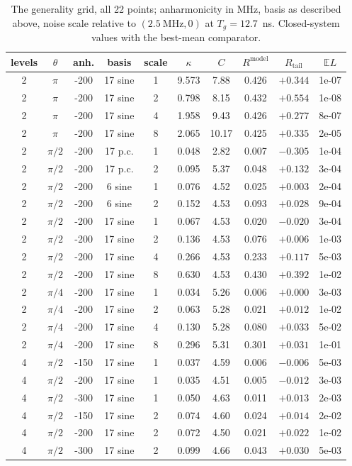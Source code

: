 \documentclass[aps,pra,onecolumn,notitlepage,superscriptaddress,nofootinbib,floatfix]{revtex4-2}
\newcommand{\E}{\mathbb{E}}
\newcommand{\Rt}{R_{\mathrm{tail}}}
\newcommand{\Rm}{R^{\mathrm{model}}}
\begin{document}
\begin{table}[htbp]
\centering\small\setlength{\tabcolsep}{4pt}
\caption{The generality grid, all 22 points; anharmonicity in MHz, basis as
described above, noise scale relative to $(2.5~\mathrm{MHz},0)$ at
$T_g=12.7$~ns. Closed-system values with the best-mean comparator.}
\label{tab:stage3C}
\begin{tabular}{@{}cccccccccc@{}}
\toprule
levels & $\theta$ & anh. & basis & scale & $\kappa$ & $C$ & $\Rm$ & $\Rt$ & $\E L$\\
\midrule
2 & $\pi$ & -200 & 17 sine & 1 & 9.573 & 7.88 & 0.426 & $+0.344$ & 1e-07 \\
2 & $\pi$ & -200 & 17 sine & 2 & 0.798 & 8.15 & 0.432 & $+0.554$ & 1e-08 \\
2 & $\pi$ & -200 & 17 sine & 4 & 1.958 & 9.43 & 0.426 & $+0.277$ & 8e-07 \\
2 & $\pi$ & -200 & 17 sine & 8 & 2.065 & 10.17 & 0.425 & $+0.335$ & 2e-05 \\
2 & $\pi/2$ & -200 & 17 p.c. & 1 & 0.048 & 2.82 & 0.007 & $-0.305$ & 1e-04 \\
2 & $\pi/2$ & -200 & 17 p.c. & 2 & 0.095 & 5.37 & 0.048 & $+0.132$ & 3e-04 \\
2 & $\pi/2$ & -200 & 6 sine & 1 & 0.076 & 4.52 & 0.025 & $+0.003$ & 2e-04 \\
2 & $\pi/2$ & -200 & 6 sine & 2 & 0.152 & 4.53 & 0.093 & $+0.028$ & 9e-04 \\
2 & $\pi/2$ & -200 & 17 sine & 1 & 0.067 & 4.53 & 0.020 & $-0.020$ & 3e-04 \\
2 & $\pi/2$ & -200 & 17 sine & 2 & 0.136 & 4.53 & 0.076 & $+0.006$ & 1e-03 \\
2 & $\pi/2$ & -200 & 17 sine & 4 & 0.266 & 4.53 & 0.233 & $+0.117$ & 5e-03 \\
2 & $\pi/2$ & -200 & 17 sine & 8 & 0.630 & 4.53 & 0.430 & $+0.392$ & 1e-02 \\
2 & $\pi/4$ & -200 & 17 sine & 1 & 0.034 & 5.26 & 0.006 & $+0.000$ & 3e-03 \\
2 & $\pi/4$ & -200 & 17 sine & 2 & 0.063 & 5.28 & 0.021 & $+0.012$ & 1e-02 \\
2 & $\pi/4$ & -200 & 17 sine & 4 & 0.130 & 5.28 & 0.080 & $+0.033$ & 5e-02 \\
2 & $\pi/4$ & -200 & 17 sine & 8 & 0.296 & 5.31 & 0.301 & $+0.031$ & 1e-01 \\
4 & $\pi/2$ & -150 & 17 sine & 1 & 0.037 & 4.59 & 0.006 & $-0.006$ & 5e-03 \\
4 & $\pi/2$ & -200 & 17 sine & 1 & 0.035 & 4.51 & 0.005 & $-0.012$ & 3e-03 \\
4 & $\pi/2$ & -300 & 17 sine & 1 & 0.050 & 4.63 & 0.011 & $+0.013$ & 2e-03 \\
4 & $\pi/2$ & -150 & 17 sine & 2 & 0.074 & 4.60 & 0.024 & $+0.014$ & 2e-02 \\
4 & $\pi/2$ & -200 & 17 sine & 2 & 0.072 & 4.50 & 0.021 & $+0.022$ & 1e-02 \\
4 & $\pi/2$ & -300 & 17 sine & 2 & 0.099 & 4.66 & 0.043 & $+0.030$ & 5e-03 \\
\bottomrule
\end{tabular}
\end{table}
\end{document}
